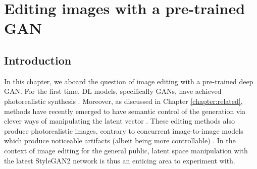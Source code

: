 \chapter{Editing images with a pre-trained GAN}
\label{chapter:magec}

\newcommand{\tableindent}{\,\,\,\,}
\newcommand{\vt}{\mathbf{t}}
\newcommand{\std}{$\pm\,$}
\newcommand{\clf}{\textit{clf}} \newcommand{\gray}[1]{{\color{darkgray}#1}}











\section{Introduction}

In this chapter, we aboard the question of image editing with a pre-trained deep \ac{GAN}.
For the first time, \ac{DL} models, specifically \ac{GAN}s, have achieved photorealistic synthesis \citep{karras2018progressive, karra2019stylegan, karra2020stylegan2}.
Moreover, as discussed in Chapter \ref{chapter:related}, methods have recently emerged to 
have semantic control of the generation via clever ways of manipulating the latent vector \citep{shen2020, abdal2020styleflow, harkonen2020ganspace, tewari2020stylerig, stylespace_analysis, zhuang2021enjoy, editing_style}.
 These editing methods also produce photorealistic images, contrary to concurrent image-to-image models which 
produce noticeable artifacts (albeit being more controllable) \citep{wang2018pix2pixHD, park2019gaugan}.
 In the context of image editing for the general public, latent space manipulation with the latest 
 StyleGAN2 network \citep{karra2020stylegan2}
is thus an enticing area to experiment with. 

